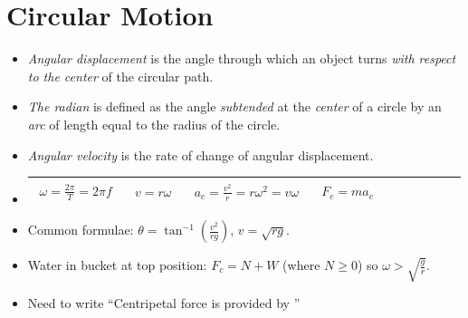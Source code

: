 \documentclass[oneside]{book}
\begin{document}
\chapter{Circular Motion}
\begin{itemize}
    \item \textit{Angular displacement} is the angle through which an object turns \emph{with respect to the center} of the circular path.
    \item \textit{The radian} is defined as the angle \emph{subtended} at the \emph{center} of a circle by an \emph{arc} of length equal to the radius of the circle. 
    \item \textit{Angular velocity} is the rate of change of angular displacement.
\end{itemize}
\begin{itemize}[label=\(\square\)]
    \item \begin{tabular}{|Sc|Sc|Sc|Sc|Sc|}
        \hline
            \(\begin{aligned}
                \omega=\frac{2\pi}{T}=2\pi f
            \end{aligned}\)&
            \(\begin{aligned}
                v=r\omega
            \end{aligned}\)&
            \(\begin{aligned}
                a_c=\frac{v^2}{r}=r\omega^2=v\omega
            \end{aligned}\)&
            \(\begin{aligned}
                F_c=ma_c
            \end{aligned}\)
        \\
        \hline
    \end{tabular}
    \item Common formulae: \(\theta=\tan^{-1}\left(\frac{v^2}{rg}\right)\), \(v=\sqrt{rg}\).
    \item Water in bucket at top position: \(F_c=N+W\) (where \(N\geq 0\)) so \(\omega>\sqrt{\frac{g}{r}}\).
    \item Need to write ``Centripetal force is provided by \underline{\hspace{1cm}}'' 
\end{itemize}
\end{document}
